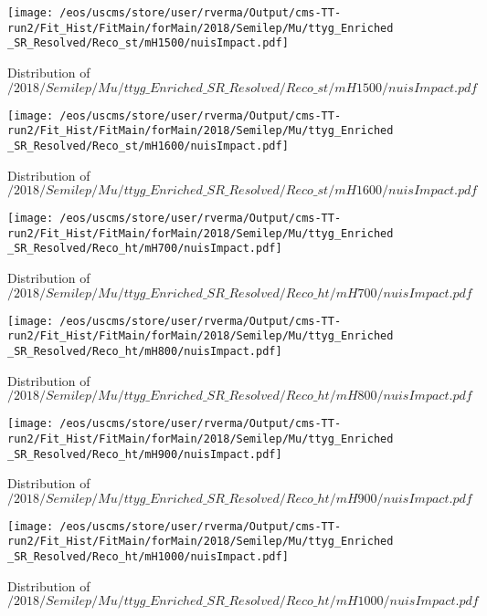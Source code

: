 \begin{figure}
\centering
\texttt{[image: /eos/uscms/store/user/rverma/Output/cms-TT-run2/Fit\_Hist/FitMain/forMain/2018/Semilep/Mu/ttyg\_Enriched\_SR\_Resolved/Reco\_st/mH1500/nuisImpact.pdf]}
\caption{Distribution of $/2018/Semilep/Mu/ttyg\_Enriched\_SR\_Resolved/Reco\_st/mH1500/nuisImpact.pdf$}
\end{figure}

\begin{figure}
\centering
\texttt{[image: /eos/uscms/store/user/rverma/Output/cms-TT-run2/Fit\_Hist/FitMain/forMain/2018/Semilep/Mu/ttyg\_Enriched\_SR\_Resolved/Reco\_st/mH1600/nuisImpact.pdf]}
\caption{Distribution of $/2018/Semilep/Mu/ttyg\_Enriched\_SR\_Resolved/Reco\_st/mH1600/nuisImpact.pdf$}
\end{figure}

\begin{figure}
\centering
\texttt{[image: /eos/uscms/store/user/rverma/Output/cms-TT-run2/Fit\_Hist/FitMain/forMain/2018/Semilep/Mu/ttyg\_Enriched\_SR\_Resolved/Reco\_ht/mH700/nuisImpact.pdf]}
\caption{Distribution of $/2018/Semilep/Mu/ttyg\_Enriched\_SR\_Resolved/Reco\_ht/mH700/nuisImpact.pdf$}
\end{figure}

\begin{figure}
\centering
\texttt{[image: /eos/uscms/store/user/rverma/Output/cms-TT-run2/Fit\_Hist/FitMain/forMain/2018/Semilep/Mu/ttyg\_Enriched\_SR\_Resolved/Reco\_ht/mH800/nuisImpact.pdf]}
\caption{Distribution of $/2018/Semilep/Mu/ttyg\_Enriched\_SR\_Resolved/Reco\_ht/mH800/nuisImpact.pdf$}
\end{figure}

\begin{figure}
\centering
\texttt{[image: /eos/uscms/store/user/rverma/Output/cms-TT-run2/Fit\_Hist/FitMain/forMain/2018/Semilep/Mu/ttyg\_Enriched\_SR\_Resolved/Reco\_ht/mH900/nuisImpact.pdf]}
\caption{Distribution of $/2018/Semilep/Mu/ttyg\_Enriched\_SR\_Resolved/Reco\_ht/mH900/nuisImpact.pdf$}
\end{figure}

\begin{figure}
\centering
\texttt{[image: /eos/uscms/store/user/rverma/Output/cms-TT-run2/Fit\_Hist/FitMain/forMain/2018/Semilep/Mu/ttyg\_Enriched\_SR\_Resolved/Reco\_ht/mH1000/nuisImpact.pdf]}
\caption{Distribution of $/2018/Semilep/Mu/ttyg\_Enriched\_SR\_Resolved/Reco\_ht/mH1000/nuisImpact.pdf$}
\end{figure}

